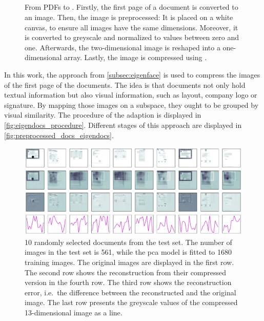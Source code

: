 \subsection{\eigendocs{}}\label{subsubsec:eigendocs}

\begin{figure}[!htb] %
    \centering
    
    \caption[\eigendocs{} procedure]{From PDFs to \eigendocs{}.
    Firstly, the first page of a document is converted to an image.
    Then, the image is preprocessed:
    It is placed on a white canvas, to ensure all images have the same dimensions.
    Moreover, it is converted to greyscale and normalized to values between zero and one.
    Afterwards, the two-dimensional image is reshaped into a one-dimensional array.
    Lastly, the image is compressed using \eigendocs{}.
    }
    \label{fig:eigendocs_procedure}
\end{figure}

In this work, the \eigenfaces{} approach from \autoref{subsec:eigenface} is used to compress the images of the first page of the documents.
The idea is that documents not only hold textual information but also visual information, such as layout, company logo or signature.
By mapping those images on a subspace, they ought to be grouped by visual similarity.
The procedure of the \eigenfaces{} adaption \textit{\eigendocs{}} is displayed in \autoref{fig:eigendocs_procedure}.
Different stages of this approach are displayed in \autoref{fig:preprocessed_docs_eigendocs}.

\begin{figure}[!htb] %
    \centering
    \includegraphics[width=1\textwidth]{images/Eigendocs/transformation/eigendocs.pdf}
    \caption[Preprocessing 10 randomly selected documents from the test set]{10 randomly selected documents from the test set.
    The number of images in the test set is 561, while the \ac{pca} model is fitted to 1680 training images.
    The original images are displayed in the first row.
    The second row shows the reconstruction from their compressed version in the fourth row.
    The third row shows the reconstruction error, i.e.\ the difference between the reconstructed and the original image.
    The last row presents the greyscale values of the compressed 13-dimensional image as a line.
    }
    \label{fig:preprocessed_docs_eigendocs}
\end{figure}

